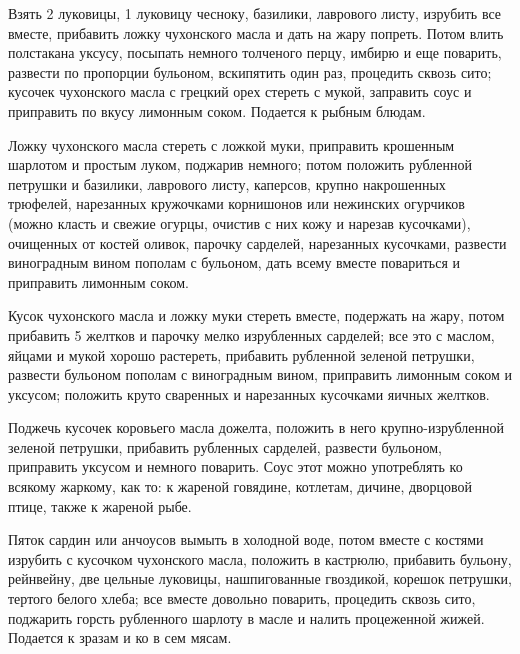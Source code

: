 
Взять 2 луковицы, 1 луковицу чесноку, базилики, лаврового листу, изрубить все вместе, прибавить ложку чухонского масла и дать на жару попреть. Потом влить полстакана уксусу, посыпать немного толченого перцу, имбирю и еще поварить, развести по пропорции бульоном, вскипятить один раз, процедить сквозь сито; кусочек чухонского масла с грецкий орех стереть с мукой, заправить соус и приправить по вкусу лимонным соком. Подается к рыбным блюдам. 


Ложку чухонского масла стереть с ложкой муки, приправить крошенным шарлотом и простым луком, поджарив немного; потом положить рубленной петрушки и базилики, лаврового листу, каперсов, крупно накрошенных трюфелей, нарезанных кружочками корнишонов или нежинских огурчиков (можно класть и свежие огурцы, очистив с них кожу и нарезав кусочками), очищенных от костей оливок, парочку сарделей, нарезанных кусочками, развести виноградным вином пополам с бульоном, дать всему вместе повариться и приправить лимонным соком. 


Кусок чухонского масла и ложку муки стереть вместе, подержать на жару, потом прибавить 5 желтков и парочку мелко изрубленных сарделей; все это с маслом, яйцами и мукой хорошо растереть, прибавить рубленной зеленой петрушки, развести бульоном пополам с виноградным вином, приправить лимонным соком и уксусом; положить круто сваренных и нарезанных кусочками яичных желтков. 


Поджечь кусочек коровьего масла дожелта, положить в него крупно-изрубленной зеленой петрушки, прибавить рубленных сарделей, развести бульоном, приправить уксусом и немного поварить. Соус этот можно употреблять ко всякому жаркому, как то: к жареной говядине, котлетам, дичине, дворцовой птице, также к жареной рыбе. 


Пяток сардин или анчоусов вымыть в холодной воде, потом вместе с костями изрубить с кусочком чухонского масла, положить в кастрюлю, прибавить бульону, рейнвейну, две цельные луковицы, нашпигованные гвоздикой, корешок петрушки, тертого белого хлеба; все вместе довольно поварить, процедить сквозь сито, поджарить горсть рубленного шарлоту в масле и налить процеженной жижей. Подается к зразам и ко в сем мясам. 

